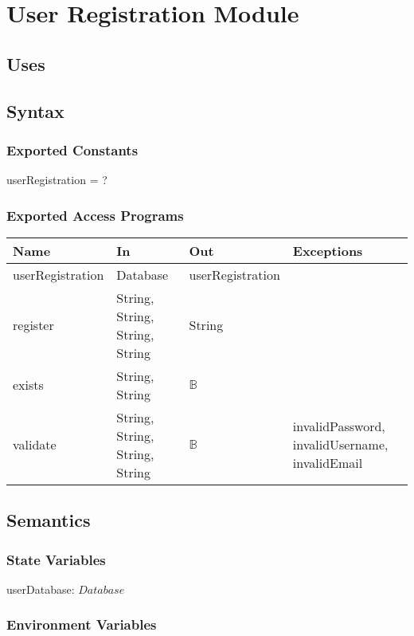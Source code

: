 \documentclass[12pt, titlepage]{article}
\begin{document}
\section{User Registration Module}

\subsection{Uses}

\subsection{Syntax}

\subsubsection{Exported Constants}
userRegistration = ?
\subsubsection{Exported Access Programs}

\begin{center}
	\begin{tabular}{p{4cm} p{4cm} p{4cm} p{4cm}}
		\hline
		\textbf{Name} & \textbf{In} & \textbf{Out} & \textbf{Exceptions} \\
		\hline
		userRegistration & Database & userRegistration &  \\
		register & String, String, String, String & String &  \\
		exists & String, String & $\mathbb{B}$ & \\
		validate & String, String, String, String & $\mathbb{B}$ & invalidPassword, invalidUsername, invalidEmail\\
		\hline
	\end{tabular}
\end{center}

\subsection{Semantics}

\subsubsection{State Variables}
userDatabase: $Database$

\subsubsection{Environment Variables}
\end{document}
